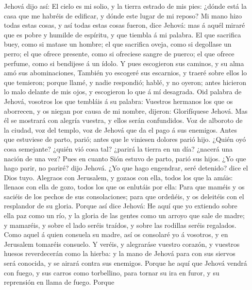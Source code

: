  Jehová dijo así: El cielo es mi solio, y la tierra
estrado de mis pies: ¿dónde está la casa que me habréis de edificar, y
dónde este lugar de mi reposo?  Mi mano hizo todas estas
cosas, y así todas estas cosas fueron, dice Jehová: mas á aquél miraré
que es pobre y humilde de espíritu, y que tiembla á mi palabra.
 El que sacrifica buey, como si matase un hombre; el que
sacrifica oveja, como si degollase un perro; el que ofrece presente,
como si ofreciese sangre de puerco; el que ofrece perfume, como si
bendijese á un ídolo. Y pues escogieron sus caminos, y su alma amó sus
abominaciones,  También yo escogeré sus escarnios, y
traeré sobre ellos lo que temieron; porque llamé, y nadie respondió;
hablé, y no oyeron; antes hicieron lo malo delante de mis ojos, y
escogieron lo que á mí desagrada.  Oid palabra de Jehová,
vosotros los que tembláis á su palabra: Vuestros hermanos los que os
aborrecen, y os niegan por causa de mi nombre, dijeron: Glorifíquese
Jehová. Mas él se mostrará con alegría vuestra, y ellos serán
confundidos.  Voz de alboroto de la ciudad, voz del
templo, voz de Jehová que da el pago á sus enemigos. 
Antes que estuviese de parto, parió; antes que le viniesen dolores parió
hijo.  ¿Quién oyó cosa semejante? ¿quién vió cosa tal?
¿parirá la tierra en un día? ¿nacerá una nación de una vez? Pues en
cuanto Sión estuvo de parto, parió sus hijos.  ¿Yo que
hago parir, no pariré? dijo Jehová. ¿Yo que hago engendrar, seré
detenido? dice el Dios tuyo.  Alegraos con Jerusalem, y
gozaos con ella, todos los que la amáis: llenaos con ella de gozo, todos
los que os enlutáis por ella:  Para que maméis y os
saciéis de los pechos de sus consolaciones; para que ordeñéis, y os
deleitéis con el resplandor de su gloria.  Porque así
dice Jehová: He aquí que yo extiendo sobre ella paz como un río, y la
gloria de las gentes como un arroyo que sale de madre; y mamaréis, y
sobre el lado seréis traídos, y sobre las rodillas seréis regalados.
 Como aquel á quien consuela su madre, así os consolaré
yo á vosotros, y en Jerusalem tomaréis consuelo.  Y
veréis, y alegraráse vuestro corazón, y vuestros huesos reverdecerán
como la hierba: y la mano de Jehová para con sus siervos será conocida,
y se airará contra sus enemigos.  Porque he aquí que
Jehová vendrá con fuego, y sus carros como torbellino, para tornar su
ira en furor, y su reprensión en llama de fuego.  Porque
